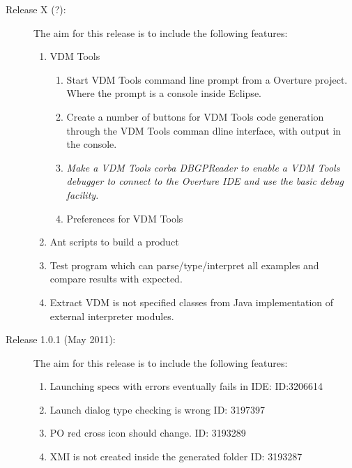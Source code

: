 \documentclass{overturerep}
\newcommand{\markDone}[1]{{\color{Gray}#1}}
\newcommand{\markDeleted}[1]{{\color{Maroon}\textit{#1}}}
\begin{document}
\begin{description}
\item[Release X (?):] The aim for this release is to
  include the following features:  
\begin{enumerate}
\item \markDone{ VDM Tools
	\begin{enumerate}
		\item Start VDM Tools command line prompt from a Overture project. Where the prompt is a console inside Eclipse.
		
		\item Create a number of buttons for VDM Tools code generation through the VDM Tools comman dline interface, with output in the console.
		
		\item \markDeleted{ Make a VDM Tools corba DBGPReader to enable a VDM Tools debugger to connect to the Overture IDE and use the basic debug facility.}
		\item Preferences for VDM Tools
	\end{enumerate}
      }




\item \markDone{Ant scripts to build a product}
\item \markDone{Test program which can parse/type/interpret all examples and compare results with expected.}
\item \markDone{Extract VDM is not specified classes from Java implementation of external interpreter modules.}

\end{enumerate}
\end{description}


\begin{description}
\item[Release 1.0.1 (May 2011):] The aim for this release is to
  include the following features:  
\begin{enumerate}
\item Launching specs with errors eventually fails in IDE: ID:3206614
\item Launch dialog type checking is wrong ID: 3197397
\item PO red cross icon should change. ID: 3193289
\item XMI is not created inside the generated folder ID: 3193287
\end{enumerate}
\end{description}
\end{document}
